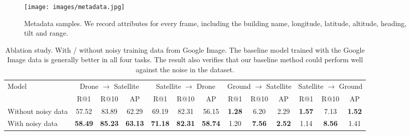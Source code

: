 \documentclass[sigconf]{acmart}
\begin{document}
\begin{figure}[t]
\begin{center}
    \texttt{[image: images/metadata.jpg]}
\end{center}
\caption{Metadata samples. We record attributes for every frame, including the building name, longitude, latitude, altitude, heading, tilt and range. }\label{fig:metadata}
\end{figure}

\setlength{\tabcolsep}{7pt}
\begin{table*}
\small
\begin{center}
\begin{tabular}{l|ccc|ccc|ccc|ccc}
\hline
\multirow{2}{*}{Model} & \multicolumn{3}{c|}{Drone $\rightarrow$ Satellite} & \multicolumn{3}{c|}{Satellite $\rightarrow$ Drone} & \multicolumn{3}{c|}{Ground $\rightarrow$ Satellite} & 
\multicolumn{3}{c}{Satellite $\rightarrow$ Ground}\\
  & R@1 & R@10 & AP & R@1 & R@10 & AP & R@1 & R@10 & AP & R@1 & R@10 & AP \\
\shline
Without noisy data  & 57.52 & 83.89 & 62.29 & 69.19 & 82.31 & 56.15 & \textbf{1.28} & 6.20 & 2.29& \textbf{1.57} & 7.13 & \textbf{1.52}\\
With noisy data & \textbf{58.49} & \textbf{85.23} &  \textbf{63.13} & \textbf{71.18} & \textbf{82.31} & \textbf{58.74} & 1.20 & \textbf{7.56} & \textbf{2.52} & 1.14 & \textbf{8.56} & 1.41 \\
\hline
\end{tabular}
\end{center}
\caption{Ablation study. With / without noisy training data from Google Image. The baseline model trained with the Google Image data is generally better in all four tasks. The result also verifies that our baseline method could perform well against the noise in the dataset.
}
\label{table:Google}
\end{table*}
\end{document}
